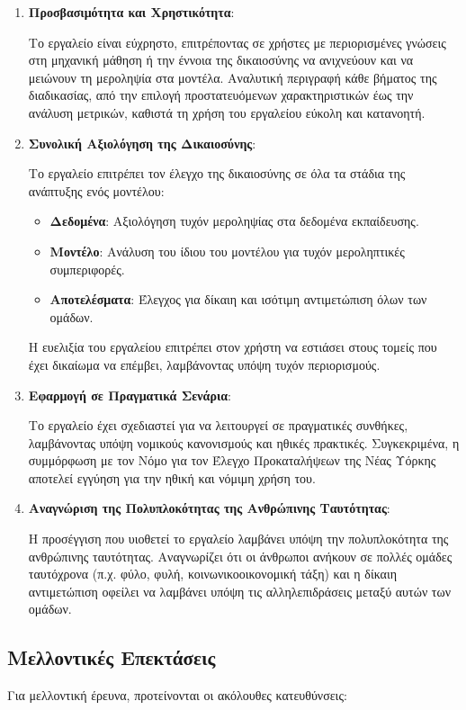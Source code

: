 \documentclass[12pt,twoside]{article}
\begin{document}
\begin{enumerate}
    \item \textbf{Προσβασιμότητα και Χρηστικότητα}:
    
    Το εργαλείο είναι εύχρηστο, επιτρέποντας σε χρήστες με περιορισμένες γνώσεις στη μηχανική μάθηση ή την έννοια της δικαιοσύνης να ανιχνεύουν και να μειώνουν τη μεροληψία στα μοντέλα. Αναλυτική περιγραφή κάθε βήματος της διαδικασίας, από την επιλογή προστατευόμενων χαρακτηριστικών έως την ανάλυση μετρικών, καθιστά τη χρήση του εργαλείου εύκολη και κατανοητή.
    
    \item \textbf{Συνολική Αξιολόγηση της Δικαιοσύνης}:
    
    Το εργαλείο επιτρέπει τον έλεγχο της δικαιοσύνης σε όλα τα στάδια της ανάπτυξης ενός μοντέλου:
    \begin{itemize}
        \item \textbf{Δεδομένα}: Αξιολόγηση τυχόν μεροληψίας στα δεδομένα εκπαίδευσης.
        \item \textbf{Μοντέλο}: Ανάλυση του ίδιου του μοντέλου για τυχόν μεροληπτικές συμπεριφορές.
        \item \textbf{Αποτελέσματα}: Έλεγχος για δίκαιη και ισότιμη αντιμετώπιση όλων των ομάδων.
    \end{itemize}
    Η ευελιξία του εργαλείου επιτρέπει στον χρήστη να εστιάσει στους τομείς που έχει δικαίωμα να επέμβει, λαμβάνοντας υπόψη τυχόν περιορισμούς.
    
    \item \textbf{Εφαρμογή σε Πραγματικά Σενάρια}:
    
    Το εργαλείο έχει σχεδιαστεί για να λειτουργεί σε πραγματικές συνθήκες, λαμβάνοντας υπόψη νομικούς κανονισμούς και ηθικές πρακτικές. Συγκεκριμένα, η συμμόρφωση με τον  Νόμο  για τον Έλεγχο Προκαταλήψεων της Νέας Υόρκης  αποτελεί εγγύηση για την ηθική και νόμιμη χρήση του.
    
    \item \textbf{Αναγνώριση της Πολυπλοκότητας της Ανθρώπινης Ταυτότητας}:
    
    Η προσέγγιση που υιοθετεί το εργαλείο λαμβάνει υπόψη την πολυπλοκότητα της ανθρώπινης ταυτότητας. Αναγνωρίζει ότι οι άνθρωποι ανήκουν σε πολλές ομάδες ταυτόχρονα (π.χ. φύλο, φυλή, κοινωνικοοικονομική τάξη) και η δίκαιη αντιμετώπιση οφείλει να λαμβάνει υπόψη τις αλληλεπιδράσεις μεταξύ αυτών των ομάδων.
\end{enumerate}

\subsection{Μελλοντικές Επεκτάσεις}
Για μελλοντική έρευνα, προτείνονται οι ακόλουθες κατευθύνσεις:
\end{document}
